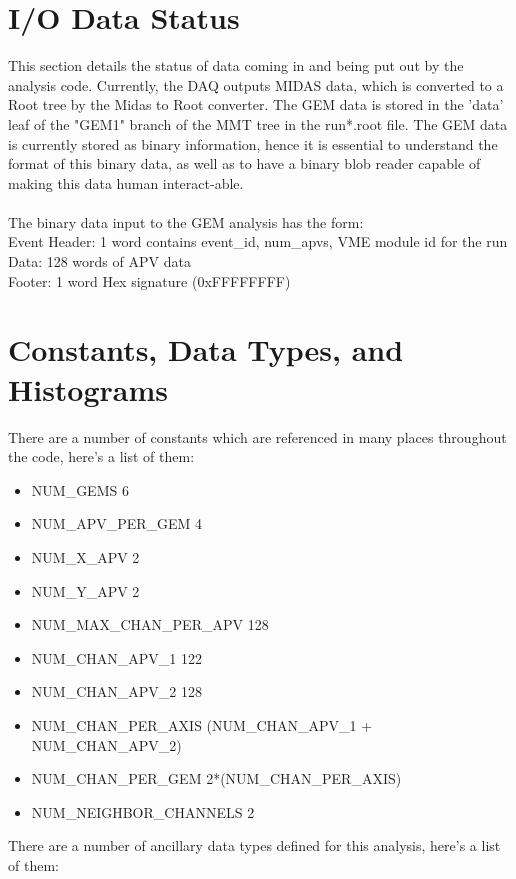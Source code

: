 \documentclass[11pt]{article}
\begin{document}
\section{I/O Data Status}
	This section details the status of data coming in and being put out by the analysis code. Currently, the DAQ outputs MIDAS data, which is converted to a Root tree by the Midas to Root converter. The GEM data is stored in the 'data' leaf of the "GEM1" branch of the MMT tree in the run*.root file. The GEM data is currently stored as binary information, hence it is essential to understand the format of this binary data, as well as to have a binary blob reader capable of making this data human interact-able.\\ \\
	The binary data input to the GEM analysis has the form:\\
	Event Header: 1 word contains event\_id, num\_apvs, VME module id  for the run \\
	Data: 128 words of APV data \\
	Footer: 1 word Hex signature (0xFFFFFFFF)
\section{Constants, Data Types, and Histograms}
There are a number of constants which are referenced in many places throughout the code, here's a list of them:

\begin{itemize}
\item NUM\_GEMS 6
\item NUM\_APV\_PER\_GEM 4
\item NUM\_X\_APV 2
\item NUM\_Y\_APV 2
\item NUM\_MAX\_CHAN\_PER\_APV 128
\item NUM\_CHAN\_APV\_1 122
\item NUM\_CHAN\_APV\_2 128
\item NUM\_CHAN\_PER\_AXIS (NUM\_CHAN\_APV\_1 + NUM\_CHAN\_APV\_2)
\item NUM\_CHAN\_PER\_GEM 2*(NUM\_CHAN\_PER\_AXIS)
\item NUM\_NEIGHBOR\_CHANNELS 2
\end{itemize}

There are a number of ancillary data types defined for this analysis, here's a list of them:
\end{document}
